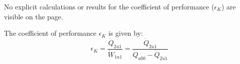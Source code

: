 No explicit calculations or results for the coefficient of performance (\(\epsilon_K\)) are visible on the page.

The coefficient of performance \( \epsilon_K \) is given by:  
\[
\epsilon_K = \frac{\dot{Q}_{2u1}}{\dot{W}_{1u1}} = \frac{\dot{Q}_{2u1}}{\dot{Q}_{a0b} - \dot{Q}_{2u1}}
\]